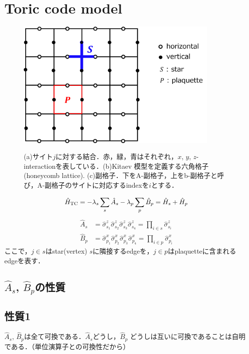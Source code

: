\documentclass[dvipdfmx,autodetect-engine]{jsarticle}
\begin{document}
\section{Toric code model}
\begin{figure}[h]
\centering
		\includegraphics[width=10.0cm]{fig_toric/toric2.png} \\
\caption{(a)サイト$j$に対する結合．赤，緑，青はそれぞれ，$x$, $y$, $z$-interactionを表している．(b)Kitaev 模型を定義する六角格子 (honeycomb lattice).
(c)副格子．下をA-副格子，上をb-副格子と呼び，A-副格子のサイトに対応するindexを$i$とする．}
\label{fig:schematic1}
\end{figure}
\begin{equation}
    \hat{H}_{\rm{TC}} = -\lambda_s \sum_{s}\hat{A}_s - \lambda_p \sum_p \hat{B}_p
    =\hat{H}_{s} + \hat{H}_p
\end{equation}
\begin{align}
    \hat{A}_s 
    &= \hat{\sigma}_{s_1}^{z} \hat{\sigma}_{s_2}^{z} \hat{\sigma}_{s_3}^{z} \hat{\sigma}_{s_4}^{z}
    =\prod_{i\in s}\hat{\sigma}^{z}_{s_i}\\[10pt]
    \hat{B}_p
    &= \hat{\sigma}_{p_1}^{x} \hat{\sigma}_{p_2}^{x} \hat{\sigma}_{p_3}^{x} \hat{\sigma}_{p_4}^{x}
    =\prod_{i\in p}\hat{\sigma}^{x}_{p_i}
\end{align}
ここで，$j\in s$はstar(vertex) $s$に隣接するedgeを，$j \in p$はplaquetteに含まれるedgeを表す．

\subsection{$\hat{A}_s$, $\hat{B}_p$の性質}
\subsection*{性質1}$\hat{A}_s$, $\hat{B}_p$は全て可換である．$\hat{A}_s$どうし，$\hat{B}_p$
どうしは互いに可換であることは自明である．（単位演算子との可換性だから）
\end{document}
